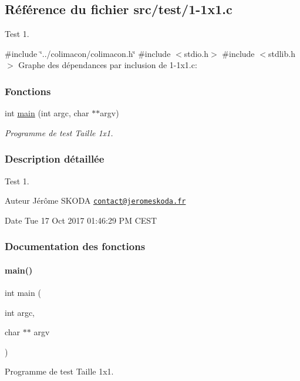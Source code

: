 \hypertarget{1-1x1_8c}{}\subsection{Référence du fichier src/test/1-\/1x1.c}
\label{1-1x1_8c}


Test 1.  


{\ttfamily \#include \char`\"{}../colimacon/colimacon.\+h\char`\"{}}\newline
{\ttfamily \#include $<$stdio.\+h$>$}\newline
{\ttfamily \#include $<$stdlib.\+h$>$}\newline
Graphe des dépendances par inclusion de 1-\/1x1.c\+:
\subsubsection*{Fonctions}
\begin{DoxyCompactItemize}
\item 
int \hyperlink{1-1x1_8c_a3c04138a5bfe5d72780bb7e82a18e627}{main} (int argc, char $\ast$$\ast$argv)
\begin{DoxyCompactList}\small\item\em Programme de test Taille 1x1. \end{DoxyCompactList}\end{DoxyCompactItemize}


\subsubsection{Description détaillée}
Test 1. 

\begin{DoxyAuthor}{Auteur}
Jérôme S\+K\+O\+DA \href{mailto:contact@jeromeskoda.fr}{\tt contact@jeromeskoda.\+fr} 
\end{DoxyAuthor}
\begin{DoxyDate}{Date}
Tue 17 Oct 2017 01\+:46\+:29 PM C\+E\+ST 
\end{DoxyDate}


\subsubsection{Documentation des fonctions}
\mbox{\label{1-1x1_8c_a3c04138a5bfe5d72780bb7e82a18e627}} 
\paragraph{\texorpdfstring{main()}{main()}}
{\footnotesize\ttfamily int main (\begin{DoxyParamCaption}\item[{int}]{argc,  }\item[{char $\ast$$\ast$}]{argv }\end{DoxyParamCaption})}



Programme de test Taille 1x1. 

